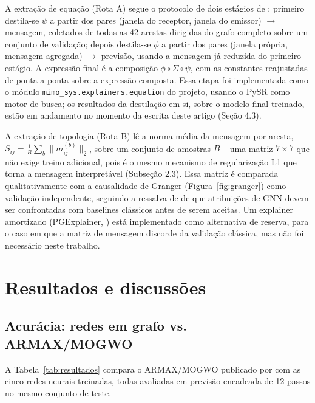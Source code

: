\documentclass[
	article,		%
	12pt,			%
	oneside,
	a4paper,
	brazil
]{abntex2}
\begin{document}
A extração de equação (Rota A) segue o protocolo de dois estágios de
: primeiro destila-se $\psi$ a partir dos pares
(janela do receptor, janela do emissor) $\to$ mensagem, coletados de todas
as 42 arestas dirigidas do grafo completo sobre um conjunto de validação;
depois destila-se $\phi$ a partir dos pares (janela própria, mensagem
agregada) $\to$ previsão, usando a mensagem já reduzida do primeiro
estágio. A expressão final é a composição $\phi \circ \Sigma \circ \psi$,
com as constantes reajustadas de ponta a ponta sobre a expressão composta.
Essa etapa foi implementada como o módulo \texttt{mimo\_sys.explainers.\allowbreak equation}
do projeto, usando o PySR \cite{cranmer2023} como motor de busca; os
resultados da destilação em si, sobre o modelo final treinado, estão em
andamento no momento da escrita deste artigo (Seção 4.3).

A extração de topologia (Rota B) lê a norma média da mensagem por aresta,
$S_{ij} = \frac{1}{B}\sum_b \lVert m_{ij}^{(b)} \rVert_2$, sobre um
conjunto de amostras $B$ -- uma matriz $7\times7$ que não exige treino
adicional, pois é o mesmo mecanismo de regularização L1 que torna a
mensagem interpretável (Subseção 2.3). Essa matriz é comparada
qualitativamente com a causalidade de Granger (Figura~\ref{fig:granger})
como validação independente, seguindo a ressalva de
 de que atribuições de GNN devem ser confrontadas
com baselines clássicos antes de serem aceitas. Um explainer amortizado
(PGExplainer, ) está implementado como alternativa de
reserva, para o caso em que a matriz de mensagem discorde da validação
clássica, mas não foi necessário neste trabalho.

\section{Resultados e discussões}

\subsection{Acurácia: redes em grafo vs. ARMAX/MOGWO}

A Tabela~\ref{tab:resultados} compara o ARMAX/MOGWO publicado por
 com as cinco redes neurais treinadas, todas
avaliadas em previsão encadeada de 12 passos no mesmo conjunto de teste.
\end{document}
